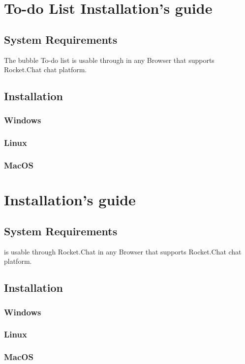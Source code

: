 \section{To-do List Installation's guide}

\subsection{System Requirements}
The bubble To-do list is usable through  in any Browser that supports Rocket.Chat chat platform.

\subsection{Installation}

\subsubsection{Windows}

\subsubsection{Linux}

\subsubsection{MacOS}

\section{\DemoName{} Installation's guide}

\subsection{ \DemoName{} System Requirements}
\DemoName{} is usable through Rocket.Chat in any Browser that supports Rocket.Chat chat platform.

\subsection{Installation}

\subsubsection{Windows}

\subsubsection{Linux}

\subsubsection{MacOS}
